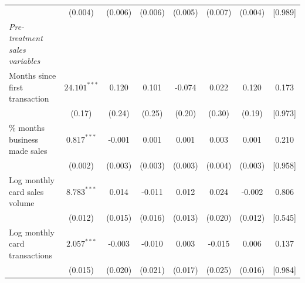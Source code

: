 \begin{table}[H]
{\begin{tabular}{lccccccc}
 & (0.004) & (0.006) & (0.006) & (0.005) & (0.007) & (0.004) & {}[0.989]\\
\emph{Pre-treatment sales variables} \\
\quad Months since first transaction & $24.101^{***}$ & 0.120 & 0.101 & -0.074 & 0.022 & 0.120 & 0.173\\
 & (0.17) & (0.24) & (0.25) & (0.20) & (0.30) & (0.19) & {}[0.973]\\
\quad \% months business made sales & $0.817^{***}$ & -0.001 & 0.001 & 0.001 & 0.003 & 0.001 & 0.210\\
 & (0.002) & (0.003) & (0.003) & (0.003) & (0.004) & (0.003) & {}[0.958]\\
\quad Log monthly card sales volume & $8.783^{***}$ & 0.014 & -0.011 & 0.012 & 0.024 & -0.002 & 0.806\\
 & (0.012) & (0.015) & (0.016) & (0.013) & (0.020) & (0.012) & {}[0.545]\\
\quad Log monthly card transactions & $2.057^{***}$ & -0.003 & -0.010 & 0.003 & -0.015 & 0.006 & 0.137\\
 & (0.015) & (0.020) & (0.021) & (0.017) & (0.025) & (0.016) & {}[0.984]\\
\bottomrule
\end{tabular}} 
\end{table} 

